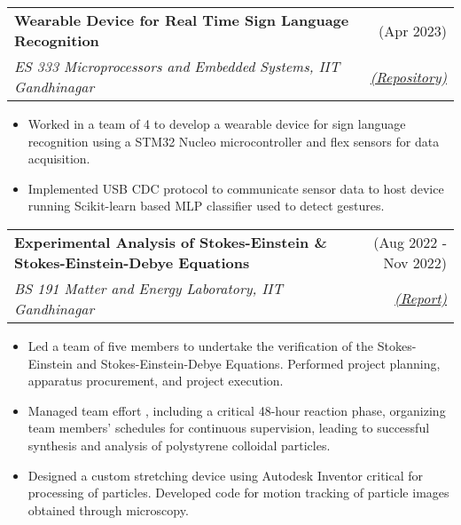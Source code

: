 \documentclass[a4paper,10pt]{report}
\makeatletter
\newcommand{\resumeSubheading}[4]{
  \vspace{-1pt}\item
    \begin{tabular*}{0.97\textwidth}[t]{l@{\extracolsep{\fill}}r}
      \textbf{#1} & #2 \\
      \textit{\small#3} & \textit{\small #4} \\
    \end{tabular*}\vspace{-6pt}
}
\makeatother
\begin{document}
\vspace{-6pt}

    \resumeSubheading
      {Wearable Device for Real Time Sign Language Recognition}{(Apr 2023)}{ES 333 Microprocessors and Embedded Systems, IIT Gandhinagar}
      {\textcolor{lightblue}{\href{https://github.com/Utkarsh-Mishra444/Sign-Recog-Glove}{(Repository)}}}{}
       \begin{itemize}
        \item Worked in a team of 4 to develop a wearable device for sign language recognition using a STM32 Nucleo microcontroller and flex sensors for data acquisition. 
        \vspace{-2pt}
        \item Implemented USB CDC protocol to communicate sensor data to host device running Scikit-learn based MLP classifier used to detect gestures.
        \vspace{-2pt}

     \end{itemize}


\vspace{-6pt}

    \resumeSubheading
      {Experimental Analysis of Stokes-Einstein \& Stokes-Einstein-Debye Equations}{(Aug 2022 - Nov 2022)}{BS 191 Matter and Energy Laboratory, IIT Gandhinagar}
      {\textcolor{lightblue}{\href{https://drive.google.com/file/d/1bTYEfIJr_yOuy1eHvitEQpjc5D6bzoEW/view?usp=sharing}{(Report)}}}{}
       \begin{itemize}
        \item Led a team of five members to undertake the verification of the Stokes-Einstein and Stokes-Einstein-Debye Equations. Performed project planning, apparatus procurement, and project execution.
        \vspace{-2pt}
        \item Managed team effort , including a critical 48-hour reaction phase, organizing team members' schedules for continuous supervision, leading to successful synthesis and analysis of polystyrene colloidal particles.
        \vspace{-2pt}
        \item Designed a custom stretching device using Autodesk Inventor critical for processing of particles. Developed code for motion tracking of particle images obtained through microscopy.
     \end{itemize}
\end{document}
